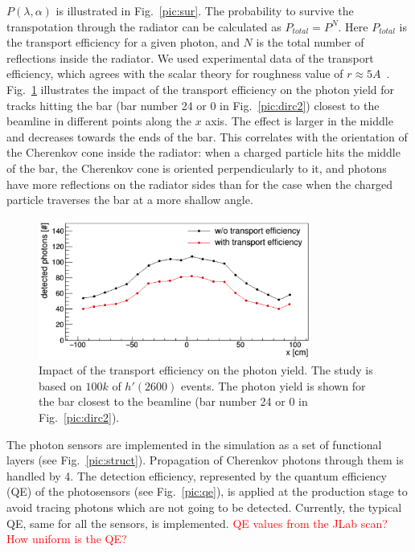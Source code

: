 $P(\lambda,\alpha)$ is illustrated in Fig.~\ref{pic:sur}. The probability to survive the transpotation through the radiator can be calculated as $P_{total} = P^{N}$. Here $P_{total}$ is the transport efficiency for a given photon, and $N$ is the total number of reflections inside the radiator. We used experimental data of the transport efficiency, which agrees with the scalar theory for roughness value of $r \approx 5 A$~\cite{roughness}. Fig.~\ref{pic:tra} illustrates the impact of the transport efficiency on the photon yield for tracks hitting the bar (bar number 24 or 0 in Fig.~\ref{pic:dirc2}) closest to the beamline in different points along the $x$ axis. The effect is larger in the middle and decreases towards the ends of the bar. This correlates with the orientation of the Cherenkov cone inside the radiator: when a charged particle hits the middle of the bar, the Cherenkov cone is oriented perpendicularly to it, and photons have more reflections on the radiator sides than for the case when the charged particle traverses the bar at a more shallow angle.

\begin{figure}[!h]
\centering
\includegraphics[width=0.8\textwidth]{pics/transport.png}
\caption{\label{pic:tra}
Impact of the transport efficiency on the photon yield. The study is based on $100k$ of $h'(2600)$ events. The photon yield is shown for the bar closest to the beamline (bar number 24 or 0 in Fig.~\ref{pic:dirc2}).
}
\end{figure}

The photon sensors are implemented in the simulation as a set of functional layers (see Fig.~\ref{pic:struct}). Propagation of Cherenkov photons through them is handled by {\geant}4. The detection efficiency, represented by the quantum efficiency (QE) of the photosensors (see Fig.~\ref{pic:qe}), is applied at the production stage to avoid tracing photons which are not going to be detected. Currently, the typical QE, same for all the sensors, is implemented. \textcolor{red}{QE values from the JLab scan? How uniform is the QE?} 


